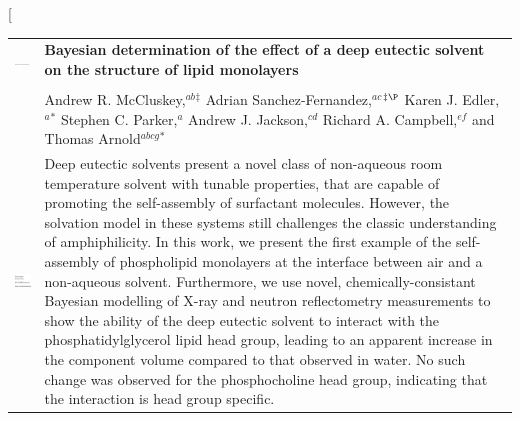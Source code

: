 \documentclass[twoside,twocolumn,9pt]{article}
\begin{document}
\twocolumn[
  \begin{@twocolumnfalse}
\vspace{3cm}
\sffamily
\begin{tabular}{m{4.5cm} p{13.5cm} }

\includegraphics{head_foot/DOI} & \noindent\LARGE{\textbf{Bayesian determination of the effect of a deep eutectic solvent on the structure of lipid monolayers}} \\%
\vspace{0.3cm} & \vspace{0.3cm} \\

 & \noindent\large{Andrew R. McCluskey,\textit{$^{ab}$}$^{\ddag}$ Adrian Sanchez-Fernandez,\textit{$^{ac}$}$^{\ddag\P}$ Karen J. Edler,\textit{$^{a}$}$^{\ast}$ Stephen C. Parker,\textit{$^{a}$} Andrew J. Jackson,\textit{$^{cd}$} Richard A. Campbell,\textit{$^{ef}$} and Thomas Arnold\textit{$^{abcg}$}$^{\ast}$} \\%

\includegraphics{head_foot/dates} & \noindent\normalsize{Deep eutectic solvents present a novel class of non-aqueous room temperature solvent with tunable properties, that are capable of promoting the self-assembly of surfactant molecules. However, the solvation model in these systems still challenges the classic understanding of amphiphilicity. In this work, we present the first example of the self-assembly of phospholipid monolayers at the interface between air and a non-aqueous solvent. Furthermore, we use novel, chemically-consistant Bayesian modelling of X-ray and neutron reflectometry measurements to show the ability of the deep eutectic solvent to interact with the phosphatidylglycerol lipid head group, leading to an apparent increase in the component volume compared to that observed in water. No such change was observed for the phosphocholine head group, indicating that the interaction is head group specific.} \\

\end{tabular}

	\end{@twocolumnfalse} \vspace{0.6cm}
\end{document}
